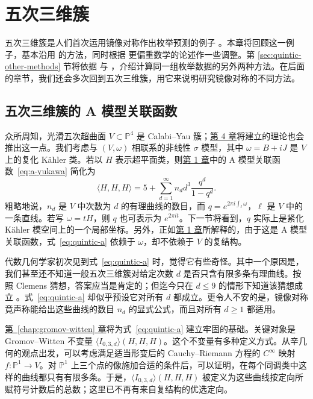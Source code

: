 \chapter{五次三维簇}\label{chap:quintic}

五次三维簇是人们首次运用镜像对称作出枚举预测的例子 。本章将回顾这一例子，基本沿用  的方法，同时根据  更偏重数学的论述作一些调整。第 \ref{sec:quintic-other-methods} 节将依据  与 ，介绍计算同一组枚举数据的另外两种方法。在后面的章节，我们还会多次回到五次三维簇，用它来说明研究镜像对称的不同方法。

\section{五次三维簇的 A 模型关联函数}\label{sec:quintic-a-model}

众所周知，光滑五次超曲面 $V\subset\mathbb P^4$ 是 Calabi--Yau 簇；\hyperref[chap:mirror-constructions]{第 4 章}将建立的理论也会推出这一点。我们考虑与 $(V,\omega)$ 相联系的非线性 $\sigma$ 模型，其中 $\omega=B+iJ$ 是 $V$ 上的复化 Kähler 类。若以 $H$ 表示超平面类，则\hyperref[chap:introduction]{第 1 章}中的 A 模型关联函数~\eqref{eq:a-yukawa} 简化为
\begin{equation}\label{eq:quintic-a}
\langle H,H,H\rangle=5+\sum_{d=1}^{\infty}n_d d^3\frac{q^d}{1-q^d}.
\end{equation}
粗略地说，$n_d$ 是 $V$ 中次数为 $d$ 的有理曲线的数目，而 $q=e^{2\pi i\int_\ell\omega}$，$\ell$ 是 $V$ 中的一条直线。若写 $\omega=tH$，则 $q$ 也可表示为 $e^{2\pi it}$。下一节将看到，$q$ 实际上是紧化 Kähler 模空间上的一个局部坐标。另外，正如\hyperref[chap:introduction]{第 1 章}所解释的，由于这是 A 模型关联函数，式~\eqref{eq:quintic-a} 依赖于 $\omega$，却不依赖于 $V$ 的复结构。

代数几何学家初次见到式~\eqref{eq:quintic-a} 时，觉得它有些奇怪。其中一个原因是，我们甚至还不知道一般五次三维簇对给定次数 $d$ 是否只含有限多条有理曲线。按照 Clemens 猜想，答案应当是肯定的；但迄今只在 $d\leq9$ 的情形下知道该猜想成立 。式~\eqref{eq:quintic-a} 却似乎预设它对所有 $d$ 都成立。更令人不安的是，镜像对称竟声称能给出这些曲线的数目 $n_d$ 的显式公式，而且对所有 $d\geq1$ 都适用。

\hyperref[chap:gromov-witten]{第~\ref*{chap:gromov-witten} 章}将为式~\eqref{eq:quintic-a} 建立牢固的基础。关键对象是 Gromov--Witten 不变量 $\langle I_{0,3,d}\rangle(H,H,H)$。这个不变量有多种定义方式。从辛几何的观点出发，可以考虑满足适当形变后的 Cauchy--Riemann 方程的 $C^\infty$ 映射 $f:\mathbb P^1\to V$。对 $\mathbb P^1$ 上三个点的像施加合适的条件后，可以证明，在每个同调类中这样的曲线都只有有限多条。于是，$\langle I_{0,3,d}\rangle(H,H,H)$ 被定义为这些曲线按定向所赋符号计数后的总数；这里已不再有来自复结构的优选定向。

